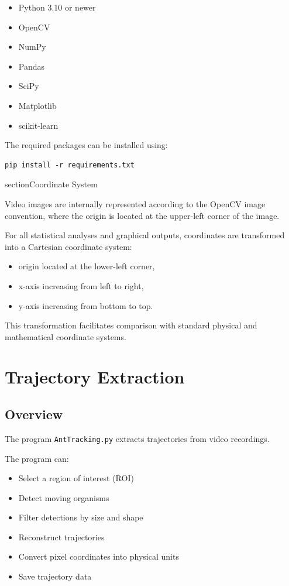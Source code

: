 \documentclass[11pt,a4paper]{article}
\begin{document}
\begin{itemize}
\item Python 3.10 or newer
\item OpenCV
\item NumPy
\item Pandas
\item SciPy
\item Matplotlib
\item scikit-learn
\end{itemize}

The required packages can be installed using:

\begin{verbatim}
pip install -r requirements.txt
\end{verbatim}

section{Coordinate System}

Video images are internally represented according to the OpenCV image convention, where the origin is located at the upper-left corner of the image.

For all statistical analyses and graphical outputs, coordinates are transformed into a Cartesian coordinate system:

\begin{itemize}
\item origin located at the lower-left corner,
\item x-axis increasing from left to right,
\item y-axis increasing from bottom to top.
\end{itemize}

This transformation facilitates comparison with standard physical and mathematical coordinate systems.


\section{Trajectory Extraction}

\subsection{Overview}

The program \texttt{AntTracking.py}  extracts trajectories from video recordings.

The program can:

\begin{itemize}
\item Select a region of interest (ROI)
\item Detect moving organisms
\item Filter detections by size and shape
\item Reconstruct trajectories
\item Convert pixel coordinates into physical units
\item Save trajectory data
\end{itemize}
\end{document}
